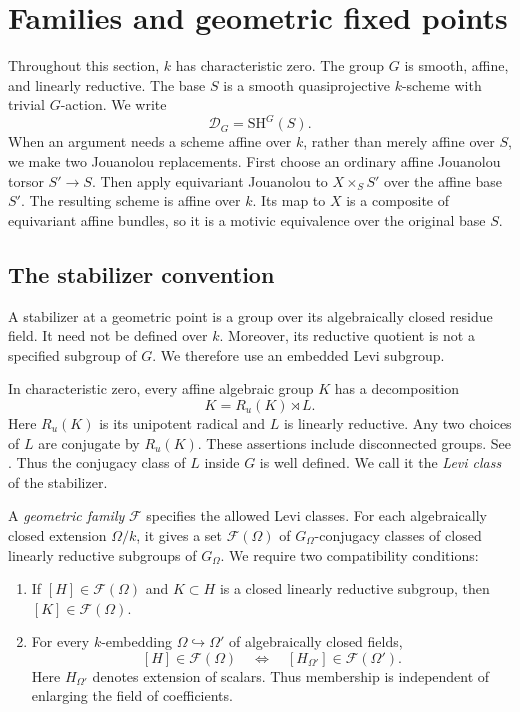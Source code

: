 \documentclass[11pt,reqno]{amsart}
\theoremstyle{definition}
\theoremstyle{remark}
\theoremstyle{plain}
\numberwithin{equation}{section}
\newcommand{\SH}{\mathrm{SH}}
\newcommand{\D}{\mathcal D}
\newcommand{\F}{\mathcal F}
\begin{document}
\section{Families and geometric fixed points}
\label{sec:isotropy}

Throughout this section, \(k\) has characteristic zero.
The group \(G\) is smooth, affine, and linearly reductive.
The base \(S\) is a smooth quasiprojective \(k\)-scheme with trivial
\(G\)-action.
We write
\[
 \D_G=\SH^G(S).
\]
When an argument needs a scheme affine over \(k\), rather than merely
affine over \(S\), we make two Jouanolou replacements.
First choose an ordinary affine Jouanolou torsor \(S'\to S\).
Then apply equivariant Jouanolou to \(X\times_S S'\) over the affine
base \(S'\).
The resulting scheme is affine over \(k\).
Its map to \(X\) is a composite of equivariant affine bundles, so it
is a motivic equivalence over the original base \(S\).

\subsection{The stabilizer convention}

A stabilizer at a geometric point is a group over its algebraically
closed residue field.
It need not be defined over \(k\).
Moreover, its reductive quotient is not a specified subgroup of \(G\).
We therefore use an embedded Levi subgroup.

In characteristic zero, every affine algebraic group \(K\) has a
decomposition
\[
 K=R_u(K)\rtimes L.
\]
Here \(R_u(K)\) is its unipotent radical and \(L\) is linearly reductive.
Any two choices of \(L\) are conjugate by \(R_u(K)\).
These assertions include disconnected groups. See
\cite[Proposition 5.4.1]{ConradReductive}.
Thus the conjugacy class of \(L\) inside \(G\) is well defined.
We call it the \emph{Levi class} of the stabilizer.


A \emph{geometric family} \(\F\) specifies the allowed Levi classes.
For each algebraically closed extension \(\Omega/k\), it gives a set
\(\F(\Omega)\) of \(G_\Omega\)-conjugacy classes of closed linearly
reductive subgroups of \(G_\Omega\).
We require two compatibility conditions:
\begin{enumerate}
\item
If \([H]\in\F(\Omega)\) and \(K\subset H\) is a closed linearly
reductive subgroup, then \([K]\in\F(\Omega)\).
\item
For every \(k\)-embedding \(\Omega\hookrightarrow\Omega'\) of
algebraically closed fields,
\[
 [H]\in\F(\Omega)
 \quad\Longleftrightarrow\quad
 [H_{\Omega'}]\in\F(\Omega').
\]
Here \(H_{\Omega'}\) denotes extension of scalars.
Thus membership is independent of enlarging the field of coefficients.
\end{enumerate}
\end{document}
